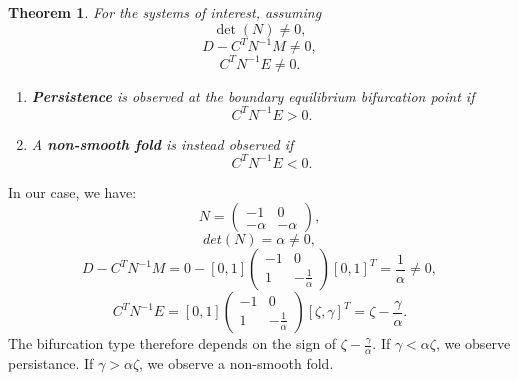 \documentclass[12pt,a4paper]{article}
\newtheorem{theorem}{Theorem}
\begin{document}
\begin{theorem}\cite{bernardo2008piecewise}
\label{thm:bifurcation_type}
For the systems of interest, assuming
\begin{equation}
    \det(N) \neq 0,
\end{equation}
\begin{equation}
    D - C^T N^{-1} M \neq 0,
\end{equation}
\begin{equation}
    C^T N^{-1} E \neq 0.
\end{equation}
\begin{enumerate}
\item \textbf{Persistence} is observed at the boundary equilibrium bifurcation point if
\begin{equation}
    C^T N^{-1} E > 0.
\end{equation}
\item A \textbf{non-smooth fold} is instead observed if
\begin{equation}
    C^T N^{-1} E < 0.
\end{equation}
\end{enumerate}  
\end{theorem}
In our case, we have:
\begin{equation}
    N = \begin{pmatrix}
        -1 & 0 \\
        -\alpha & -{\alpha}
        \end{pmatrix},
\end{equation}
\begin{equation}
    det(N) = \alpha \neq 0,
\end{equation}
\begin{equation}
    D - C^T N^{-1} M = 0 - [0, 1] \begin{pmatrix}
        -1 & 0 \\
        1 & -\frac{1}{\alpha}
        \end{pmatrix} [0, 1]^T = \frac{1}{\alpha} \neq 0,
\end{equation}
\begin{equation}
    C^T N^{-1} E = [0, 1] \begin{pmatrix}
        -1 & 0 \\
        1 & -\frac{1}{\alpha}
        \end{pmatrix} [\zeta, \gamma]^T = \zeta - \frac{\gamma}{\alpha}.
\end{equation}
The bifurcation type therefore depends on the sign of $\zeta - \frac{\gamma}{\alpha}$. If $\gamma < \alpha \zeta$, we observe persistance. If $\gamma > \alpha \zeta$, we observe a non-smooth fold.
\end{document}
